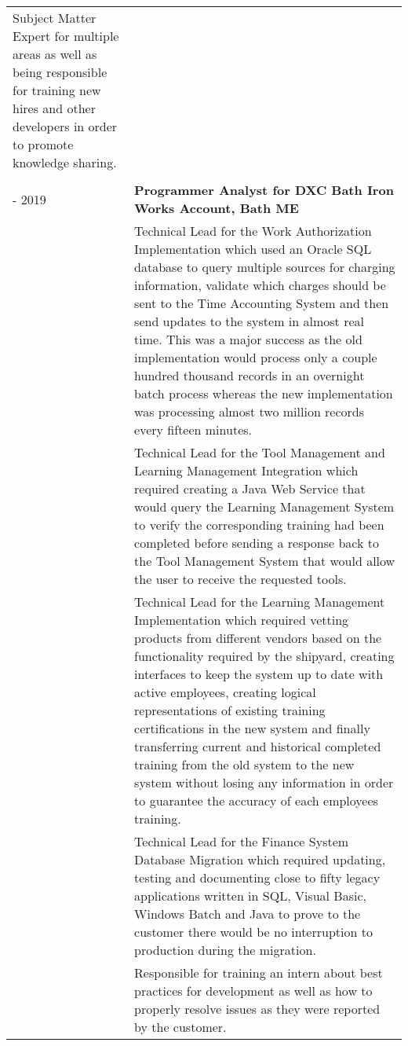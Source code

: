 \documentclass[12pt, letterpaper]{article}
\begin{document}
\begin{longtable}{p{1in}|p{6in}}
	Subject Matter Expert for multiple areas as well as being responsible for training new hires and other developers in order to promote knowledge sharing.\\
        \multicolumn{2}{c}{}\\
	\centering 2015 - 2019 & \textbf{Programmer Analyst for DXC Bath Iron Works Account, Bath ME}\vspace{0.1cm}\\&
        Technical Lead for the Work Authorization Implementation which used an Oracle SQL database to query multiple sources for charging information, validate which charges should be sent to the Time Accounting System and then send updates to the system in almost real time. This was a major success as the old implementation would process only a couple hundred thousand records in an overnight batch process whereas the new implementation was processing almost two million records every fifteen minutes.\vspace{0.2cm}\\&
        Technical Lead for the Tool Management and Learning Management Integration which required creating a Java Web Service that would query the Learning Management System to verify the corresponding training had been completed before sending a response back to the Tool Management System that would allow the user to receive the requested tools.\vspace{0.2cm}\\&
        Technical Lead for the Learning Management Implementation which required vetting products from different vendors based on the functionality required by the shipyard, creating interfaces to keep the system up to date with active employees, creating logical representations of existing training certifications in the new system and finally transferring current and historical completed training from the old system to the new system without losing any information in order to guarantee the accuracy of each employees training.\vspace{0.2cm}\\&
        Technical Lead for the Finance System Database Migration which required updating, testing and documenting close to fifty legacy applications written in SQL, Visual Basic, Windows Batch and Java to prove to the customer there would be no interruption to production during the migration.\vspace{0.2cm}\\&
        Responsible for training an intern about best practices for development as well as how to properly resolve issues as they were reported by the customer.\\

\end{longtable}
\end{document}

